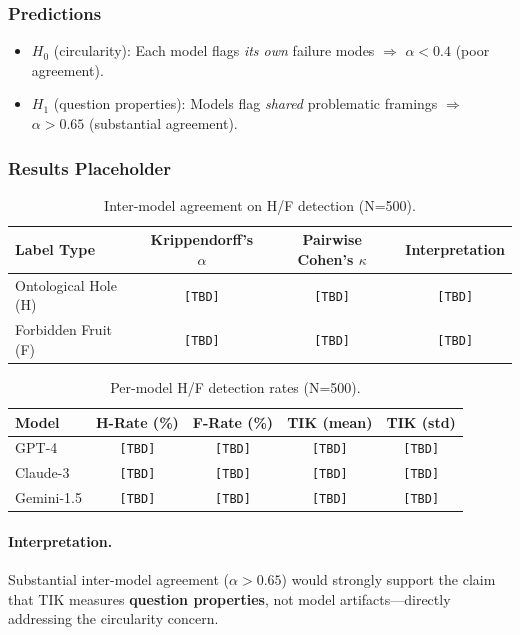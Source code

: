 \documentclass[11pt]{article}
\begin{document}
\subsubsection{Predictions}

\begin{itemize}
    \item $H_0$ (circularity): Each model flags \emph{its own} failure modes $\Rightarrow$ $\alpha < 0.4$ (poor agreement).
    \item $H_1$ (question properties): Models flag \emph{shared} problematic framings $\Rightarrow$ $\alpha > 0.65$ (substantial agreement).
\end{itemize}

\subsubsection{Results Placeholder}

\begin{table}[h]
\centering
\caption{Inter-model agreement on H/F detection (N=500).}
\label{tab:cross-model-results}
\begin{tabular}{lccc}
\toprule
Label Type & Krippendorff's $\alpha$ & Pairwise Cohen's $\kappa$ & Interpretation \\
\midrule
Ontological Hole (H) & \texttt{[TBD]} & \texttt{[TBD]} & \texttt{[TBD]} \\
Forbidden Fruit (F) & \texttt{[TBD]} & \texttt{[TBD]} & \texttt{[TBD]} \\
\bottomrule
\end{tabular}
\end{table}

\begin{table}[h]
\centering
\caption{Per-model H/F detection rates (N=500).}
\label{tab:per-model-rates}
\begin{tabular}{lcccc}
\toprule
Model & H-Rate (\%) & F-Rate (\%) & TIK (mean) & TIK (std) \\
\midrule
GPT-4 & \texttt{[TBD]} & \texttt{[TBD]} & \texttt{[TBD]} & \texttt{[TBD]} \\
Claude-3 & \texttt{[TBD]} & \texttt{[TBD]} & \texttt{[TBD]} & \texttt{[TBD]} \\
Gemini-1.5 & \texttt{[TBD]} & \texttt{[TBD]} & \texttt{[TBD]} & \texttt{[TBD]} \\
\bottomrule
\end{tabular}
\end{table}

\paragraph{Interpretation.} Substantial inter-model agreement ($\alpha > 0.65$) would strongly support the claim that TIK measures \textbf{question properties}, not model artifacts—directly addressing the circularity concern.
\end{document}
